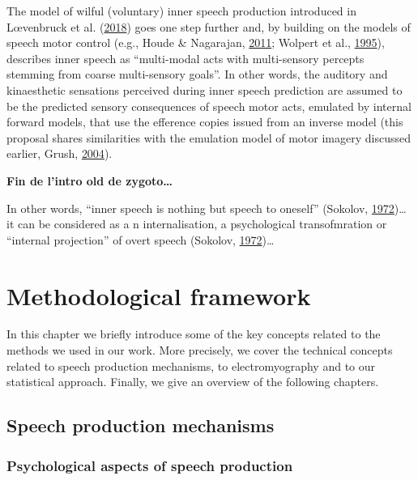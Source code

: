 \documentclass[a4paper,12pt,twoside,openright,oldfontcommands]{memoir}
\newcommand{\initial}[1]{
	\lettrine[lines=3,lhang=0.33,nindent=0em]{
		\color{gray}
     		{\textsc{#1}}}{}}
\begin{document}
The model of wilful (voluntary) inner speech production introduced in Lœvenbruck et al. (\protect\hyperlink{ref-loevenbruck_cognitive_2018}{2018}) goes one step further and, by building on the models of speech motor control (e.g., Houde \& Nagarajan, \protect\hyperlink{ref-houde_speech_2011}{2011}; Wolpert et al., \protect\hyperlink{ref-wolpert_internal_1995}{1995}), describes inner speech as \enquote{multi-modal acts with multi-sensory percepts stemming from coarse multi-sensory goals}. In other words, the auditory and kinaesthetic sensations perceived during inner speech prediction are assumed to be the predicted sensory consequences of speech motor acts, emulated by internal forward models, that use the efference copies issued from an inverse model (this proposal shares similarities with the emulation model of motor imagery discussed earlier, Grush, \protect\hyperlink{ref-grush_emulation_2004}{2004}).

\textbf{Fin de l'intro old de zygoto\ldots{}}

In other words, \enquote{inner speech is nothing but speech to oneself} (Sokolov, \protect\hyperlink{ref-sokolov_inner_1972}{1972})\ldots{} it can be considered as a n internalisation, a psychological transofmration or \enquote{internal projection} of overt speech (Sokolov, \protect\hyperlink{ref-sokolov_inner_1972}{1972})\ldots{}

\hypertarget{methodological-framework}{%
\chapter{Methodological framework}\label{methodological-framework}}

\initial{I}n this chapter we briefly introduce some of the key concepts related to the methods we used in our work. More precisely, we cover the technical concepts related to speech production mechanisms, to electromyography and to our statistical approach. Finally, we give an overview of the following chapters.

\hypertarget{speech-production-mechanisms}{%
\section{Speech production mechanisms}\label{speech-production-mechanisms}}

\hypertarget{psychological-aspects-of-speech-production}{%
\subsection{Psychological aspects of speech production}\label{psychological-aspects-of-speech-production}}
\end{document}
